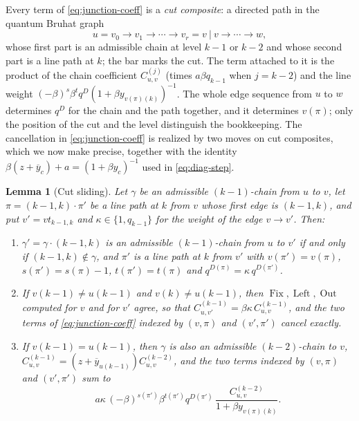 \documentclass[11pt]{article}
\newtheorem{lemma}[proposition]{Lemma}
\newcommand{\Fix}{\operatorname{Fix}}
\newcommand{\Left}{\operatorname{Left}}
\newcommand{\Out}{\operatorname{Out}}
\begin{document}
Every term of \eqref{eq:junction-coeff} is a \emph{cut composite}:
a directed path in the quantum Bruhat graph
\[
 u=v_0\to v_1\to\cdots\to v_r=v\ \big|\ v\to\cdots\to w,
\]
whose first part is an admissible chain at level $k-1$ or $k-2$ and
whose second part is a line path at $k$; the bar marks the cut. The
term attached to it is the product of the chain coefficient
$C^{(j)}_{u,v}$ (times $a\beta q_{k-1}$ when $j=k-2$) and the line
weight $(-\beta)^{s}\beta^{t}q^{D}(1+\beta y_{v(\pi)(k)})^{-1}$.
The whole edge sequence from $u$ to $w$ determines $q^{D}$ for the
chain and the path together, and it determines $v(\pi)$; only the
position of the cut and the level distinguish the bookkeeping. The
cancellation in \eqref{eq:junction-coeff} is realized by two moves
on cut composites, which we now make precise, together with the
identity $\beta(z+\overline y_c)+a=(1+\beta y_c)^{-1}$ used in
\eqref{eq:diag-step}.

\begin{lemma}[Cut sliding]\label{lem:peel}
Let $\gamma$ be an admissible $(k-1)$-chain from $u$ to $v$, let
$\pi=(k-1,k)\cdot\pi'$ be a line path at $k$ from $v$ whose first
edge is $(k-1,k)$, and put $v'=vt_{k-1,k}$ and
$\kappa\in\{1,q_{k-1}\}$ for the weight of the edge $v\to v'$. Then:
\begin{enumerate}
\item $\gamma'=\gamma\cdot(k-1,k)$ is an admissible $(k-1)$-chain
 from $u$ to $v'$ if and only if $(k-1,k)\notin\gamma$, and $\pi'$
 is a line path at $k$ from $v'$ with $v(\pi')=v(\pi)$,
 $s(\pi')=s(\pi)-1$, $t(\pi')=t(\pi)$ and $q^{D(\pi)}=\kappa\,q^{D(\pi')}$.
\item If $v(k-1)\neq u(k-1)$ and $v(k)\neq u(k-1)$, then
 $\Fix,\Left,\Out$ computed for $v$ and for $v'$ agree, so that
 $C^{(k-1)}_{u,v'}=\beta\kappa\,C^{(k-1)}_{u,v}$, and the two terms of
 \eqref{eq:junction-coeff} indexed by $(v,\pi)$ and $(v',\pi')$
 cancel exactly.
\item If $v(k-1)=u(k-1)$, then $\gamma$ is also an admissible
 $(k-2)$-chain to $v$, $C^{(k-1)}_{u,v}=(z+\overline y_{u(k-1)})C^{(k-2)}_{u,v}$,
 and the two terms indexed by $(v,\pi)$ and $(v',\pi')$ sum to
 \begin{equation}\label{eq:peel-residue}
  a\kappa\,(-\beta)^{s(\pi')}\beta^{t(\pi')}q^{D(\pi')}\,
   \frac{C^{(k-2)}_{u,v}}{1+\beta y_{v(\pi)(k)}}.
 \end{equation}
\end{enumerate}
\end{lemma}
\end{document}
